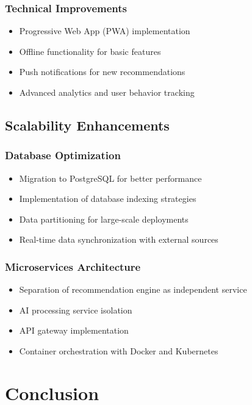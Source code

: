 \documentclass[12pt,a4paper]{article}
\begin{document}
\subsubsection{Technical Improvements}
\begin{itemize}
    \item Progressive Web App (PWA) implementation
    \item Offline functionality for basic features
    \item Push notifications for new recommendations
    \item Advanced analytics and user behavior tracking
\end{itemize}

\subsection{Scalability Enhancements}

\subsubsection{Database Optimization}
\begin{itemize}
    \item Migration to PostgreSQL for better performance
    \item Implementation of database indexing strategies
    \item Data partitioning for large-scale deployments
    \item Real-time data synchronization with external sources
\end{itemize}

\subsubsection{Microservices Architecture}
\begin{itemize}
    \item Separation of recommendation engine as independent service
    \item AI processing service isolation
    \item API gateway implementation
    \item Container orchestration with Docker and Kubernetes
\end{itemize}

\section{Conclusion}
\end{document}
